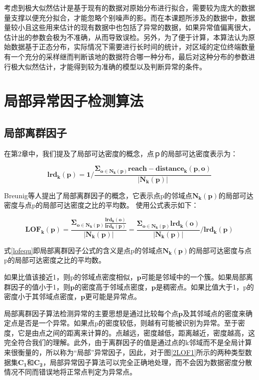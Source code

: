 \documentclass[a4paper,AutoFakeBold,oneside,12pt]{book}
\begin{document}

	考虑到极大似然估计是基于现有的数据对原始分布进行拟合，需要较为庞大的数据量支撑以便充分拟合，才能忽略个别噪声的影。而在本课题所涉及的数据中，数据量较小且这些用来估计的现有数据中也包括了异常的数据，如果异常值偏离很大，估计出的参数会极为不准确，从而导致误检。另外，为了便于计算，本算法认为原始数据基于正态分布，实际情况下需要进行长时间的统计，对区域的定位终端数量有一个充分的采样继而判断该地的数据符合哪一种分布，最后对这种分布的参数进行极大似然估计，才能得到较为准确的模型以及判断异常的条件。

\section{局部异常因子检测算法}
\subsection{局部离群因子}

	在第2章中，我们提及了局部可达密度的概念，点ｐ的局部可达密度表示为：

	\begin{equation}
	\label{lrdequ}
	\bm{lrd_k(p)}=\bm{1}/\frac{\bm{\Sigma_{o\in N_k(p)} reach-distance_k(p,o)}}{\bm{|N_k(p)|}}
	\end{equation}

	Breunig等人提出了局部离群因子的概念\cite{breunig2000lof}，它表示点p的邻域点$\bm{N_k(p)}$的局部可达密度与点p的局部可达密度之比的平均数。 使用公式表示如下：

	\begin{equation}
	\label{lofequ}
	\bm{LOF_k(p)}=\frac{\bm{\Sigma_{o\in N_k(p)} \frac{lrd_k(o)}{lrd_k(p)}}}{\bm{|N_k(p)|}}=\frac{\bm{\Sigma_{o\in N_k(p)} lrd_k(o)}}{\bm{|N_k(p)|}}/\bm{lrd_k(p)}
	\end{equation}

	式\ref{lofequ}即局部离群因子公式的含义是点p的邻域点$\bm{N_k(p)}$的局部可达密度与点p的局部可达密度之比的平均数。

	如果比值该接近1，则p的邻域点密度相似，$\bm{p}$可能是邻域中的一个簇。如果局部离群因子的值小于1，则$\bm{p}$的密度高于邻域点密度，$\bm{p}$是稠密点。如果比值大于1，p的密度小于其邻域点密度，$\bm{p}$更可能是异常点。

	局部离群因子算法检测异常的主要思想是通过比较每个点$\bm{p}$及其邻域点的密度来确定点是否是一个异常。如果点p的密度较低，则越有可能被识别为异常。至于密度，它是由点之间的距离来计算的。点越远，密度越低，距离越近，密度越高，这完全符合我们的理解。此外，由于离群因子的值是通过点的k邻域而不是全局计算来很衡量的，所以称为“局部”异常因子，因此，对于图\ref{2LOF1}所示的两种类型数据集$\bm{C_1}$和$\bm{C_2}$，局部异常因子算法可以完全正确地处理，而不会因为数据密度分散情况不同而错误地将正常点判定为异常点。
\end{document}
